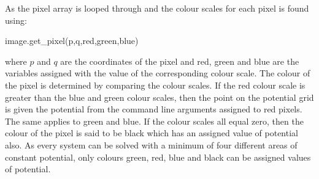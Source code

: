 As the pixel array is looped through and the colour scales for each pixel is found using:
\begin{listing}
image.get_pixel(p,q,red,green,blue)
\end{listing}
where $p$ and $q$ are the coordinates of the pixel and red, green and blue are the variables assigned with the value of the corresponding colour scale. The colour of the pixel is determined by comparing the colour scales. If the red colour scale is greater than the blue and green colour scales, then the point on the potential grid is given the potential from the command line arguments assigned to red pixels. The same applies to green and blue. If the colour scales all equal zero, then the colour of the pixel is said to be black which has an assigned value of potential also. As every system can be solved with a minimum of four different areas of constant potential, only colours green, red, blue and black can be assigned values of potential.
